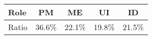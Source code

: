 \begin{tabular}{l|c|c|c|c}
Role&PM&ME&UI&ID\\\hline
Ratio&36.6\%&22.1\%&19.8\%&21.5\%\\
\end{tabular}
